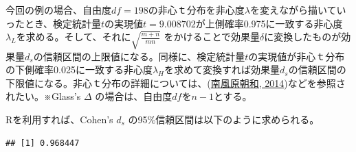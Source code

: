 \documentclass[
  ja=standard, xelatex, base=12pt]{bxjsreport}
\newenvironment{Shaded}{\begin{snugshade}}{\end{snugshade}}
\newcommand{\AttributeTok}[1]{\textcolor[rgb]{0.77,0.63,0.00}{#1}}
\newcommand{\CommentTok}[1]{\textcolor[rgb]{0.56,0.35,0.01}{\textit{#1}}}
\newcommand{\DecValTok}[1]{\textcolor[rgb]{0.00,0.00,0.81}{#1}}
\newcommand{\FunctionTok}[1]{\textcolor[rgb]{0.00,0.00,0.00}{#1}}
\newcommand{\NormalTok}[1]{#1}
\newcommand{\OtherTok}[1]{\textcolor[rgb]{0.56,0.35,0.01}{#1}}
\newcommand{\SpecialCharTok}[1]{\textcolor[rgb]{0.00,0.00,0.00}{#1}}
\begin{document}
今回の例の場合、自由度\(df=198\)の非心ｔ分布を非心度\(λ\)を変えながら描いていったとき、検定統計量\(t\)の実現値\(t=9.008702\)が上側確率0.975に一致する非心度\(λ_L\)を求める。そして、それに\(\sqrt{\frac{m+n}{mn}}\) をかけることで効果量\(\delta\)に変換したものが効果量\(d_s\)の信頼区間の上限値になる。同様に、検定統計量\(t\)の実現値が非心ｔ分布の下側確率0.025に一致する非心度\(λ_H\)を求めて変換すれば効果量\(d_s\)の信頼区間の下限値になる。非心ｔ分布の詳細については、(\protect\hyperlink{ref-haebara2014}{南風原朝和, 2014})などを参照されたい。※Glass's \(\Delta\) の場合は、自由度\(df\)を\(n-1\)とする。

Rを利用すれば、Cohen's \(d_s\) の95\%信頼区間は以下のように求められる。

\begin{Shaded}
\end{Shaded}

\begin{verbatim}
## [1] 0.968447
\end{verbatim}

\begin{Shaded}
\end{Shaded}
\end{document}
